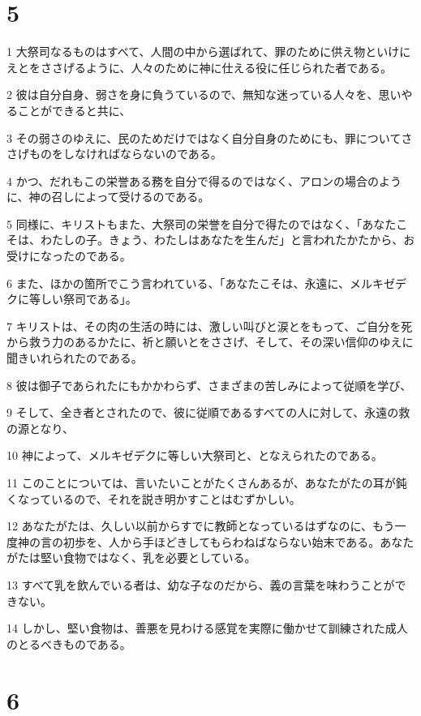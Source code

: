 \chapter{5}

\par 1 大祭司なるものはすべて、人間の中から選ばれて、罪のために供え物といけにえとをささげるように、人々のために神に仕える役に任じられた者である。
\par 2 彼は自分自身、弱さを身に負うているので、無知な迷っている人々を、思いやることができると共に、
\par 3 その弱さのゆえに、民のためだけではなく自分自身のためにも、罪についてささげものをしなければならないのである。
\par 4 かつ、だれもこの栄誉ある務を自分で得るのではなく、アロンの場合のように、神の召しによって受けるのである。
\par 5 同様に、キリストもまた、大祭司の栄誉を自分で得たのではなく、「あなたこそは、わたしの子。きょう、わたしはあなたを生んだ」と言われたかたから、お受けになったのである。
\par 6 また、ほかの箇所でこう言われている、「あなたこそは、永遠に、メルキゼデクに等しい祭司である」。
\par 7 キリストは、その肉の生活の時には、激しい叫びと涙とをもって、ご自分を死から救う力のあるかたに、祈と願いとをささげ、そして、その深い信仰のゆえに聞きいれられたのである。
\par 8 彼は御子であられたにもかかわらず、さまざまの苦しみによって従順を学び、
\par 9 そして、全き者とされたので、彼に従順であるすべての人に対して、永遠の救の源となり、
\par 10 神によって、メルキゼデクに等しい大祭司と、となえられたのである。
\par 11 このことについては、言いたいことがたくさんあるが、あなたがたの耳が鈍くなっているので、それを説き明かすことはむずかしい。
\par 12 あなたがたは、久しい以前からすでに教師となっているはずなのに、もう一度神の言の初歩を、人から手ほどきしてもらわねばならない始末である。あなたがたは堅い食物ではなく、乳を必要としている。
\par 13 すべて乳を飲んでいる者は、幼な子なのだから、義の言葉を味わうことができない。
\par 14 しかし、堅い食物は、善悪を見わける感覚を実際に働かせて訓練された成人のとるべきものである。

\chapter{6}

